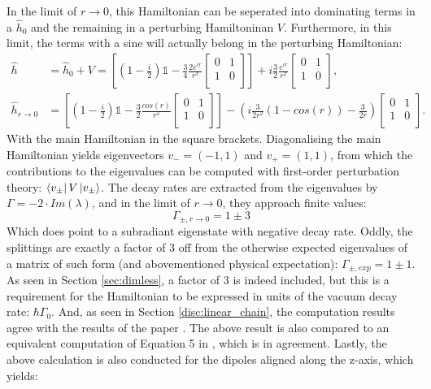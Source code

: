 \documentclass{article}
\begin{document}
In the limit of $r\rightarrow 0$, this Hamiltonian can be seperated into dominating terms in a $\hat{h}_0$ and the remaining in a perturbing Hamiltoninan $V$. Furthermore, in this limit, the terms with a sine will actually belong in the perturbing Hamiltonian:
\begin{equation}\label{eq:pertubation}
    \begin{split}
        \hat{h} &= \hat{h}_0 + V = \left[ \left( 1 - \frac{i}{2} \right) \mathds{1} - \frac{3}{4} \frac{2e^{ir}}{r^3} \begin{bmatrix} 0 & 1 \\ 1 & 0 \\ \end{bmatrix} \right] + i \frac{3}{2} \frac{e^{ir}}{r^2} \begin{bmatrix} 0 & 1 \\ 1 & 0 \\ \end{bmatrix}, \\
        \hat{h}_{r\rightarrow 0} &= \left[ \left( 1 - \frac{i}{2} \right) \mathds{1} - \frac{3}{2} \frac{cos(r)}{r^3} \begin{bmatrix} 0 & 1 \\ 1 & 0 \\ \end{bmatrix} \right] - \left( i \frac{3}{2r^2} \left(1 - cos(r)\right) - \frac{3}{2r} \right) \begin{bmatrix} 0 & 1 \\ 1 & 0 \\ \end{bmatrix}.
    \end{split}
\end{equation}
With the main Hamiltonian in the square brackets. Diagonalising the main Hamiltonian yields eigenvectors $v_- = (-1, 1)$ and $v_+ = (1, 1)$, from which the contributions to the eigenvalues can be computed with first-order perturbation theory: $\bra{v_{\pm}} V \ket{v_{\pm}}$. The decay rates are extracted from the eigenvalues by $\Gamma = -2 \cdot Im(\lambda)$, and in the limit of $r\rightarrow 0$, they approach finite values:
\begin{equation}\label{eq:N2_decayrates_ex}
    \Gamma_{\pm,r\rightarrow 0} = 1 \pm 3
\end{equation}
Which does point to a subradiant eigenstate with negative decay rate. Oddly, the splittings are exactly a factor of 3 off from the otherwise expected eigenvalues of a matrix of such form (and abovementioned physical expectation): $\Gamma_{\pm, exp} = 1 \pm 1$. As seen in Section \ref{sec:dimless}, a factor of 3 is indeed included, but this is a requirement for the Hamiltonian to be expressed in units of the vacuum decay rate: $\hbar \Gamma_0$. And, as seen in Section \ref{disc:linear_chain}, the computation results agree with the results of the paper \cite{Asenjo}. The above result is also compared to an equivalent computation of Equation 5 in \cite{PetrosyanMolmer}, which is in agreement. Lastly, the above calculation is also conducted for the dipoles aligned along the z-axis, which yields:
\end{document}
